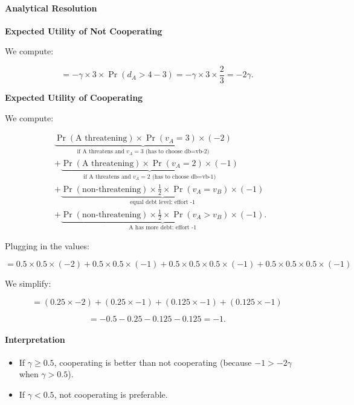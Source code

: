 \documentclass{article}
\begin{document}



\paragraph{Analytical Resolution}

\textbf{Expected Utility of Not Cooperating}

We compute:

\[
= -\gamma \times 3 \times \Pr(d_A > 4 - 3)
= -\gamma \times 3 \times \frac{2}{3}
= -2\gamma.
\]

\textbf{Expected Utility of Cooperating}

We compute:

\begin{align*}
&\underbrace{
    \Pr(\text{A threatening}) \times \Pr(v_A = 3) \times (-2)
}_{\text{if A threatens and $v_A = 3$ (has to choose db=vb-2)}}
\\[3ex]
&+
\underbrace{
    \Pr(\text{A threatening}) \times \Pr(v_A = 2) \times (-1)
}_{\text{if A threatens and $v_A = 2$ (has to choose db=vb-1)}}
\\[3ex]
&+
\underbrace{
    \Pr(\text{non-threatening}) \times \frac{1}{2} \times \Pr(v_A = v_B) \times (-1)
}_{\text{equal debt level: effort -1}}
\\[3ex]
&+
\underbrace{
    \Pr(\text{non-threatening}) \times \frac{1}{2} \times \Pr(v_A > v_B) \times (-1)
}_{\text{A has more debt: effort -1}}.
\end{align*}

Plugging in the values:

\[
= 0.5 \times 0.5 \times (-2)
+ 0.5 \times 0.5 \times (-1)
+ 0.5 \times 0.5 \times 0.5 \times (-1)
+ 0.5 \times 0.5 \times 0.5 \times (-1)
\]

We simplify:

\[
= (0.25 \times -2)
+ (0.25 \times -1)
+ (0.125 \times -1)
+ (0.125 \times -1)
\]

\[
= -0.5 - 0.25 - 0.125 - 0.125 = -1.
\]

\paragraph{Interpretation}

\begin{itemize}
    \item If $\gamma \geq 0.5$, cooperating is better than not cooperating (because $-1 > -2\gamma$ when $\gamma > 0.5$).
    \item If $\gamma < 0.5$, not cooperating is preferable.
\end{itemize}
\end{document}
